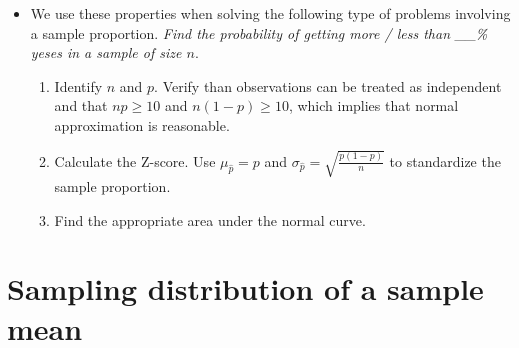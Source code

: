 \begin{itemize}
\item We use these properties when solving the following type of  problems involving a sample proportion.  
\emph{Find the probability of getting more / less than \_\_\% yeses in a sample of size $n$}.
\begin{enumerate}\vspace{-1mm}
\setlength{\itemsep}{0mm}
\item Identify $n$ and $p$. Verify than observations can be treated as independent and that $np\ge 10$ and $n(1-p)\ge 10$, which implies that normal approximation is reasonable. 
\item Calculate the Z-score.  Use $\mu_{\hat{p}} = p$ and $\sigma_{\hat{p}} = \sqrt{\frac{p(1-p)}{n}}$ to standardize the sample proportion.  
\item Find the appropriate area under the normal curve.  \end{enumerate}

\end{itemize}

{}






\section[Sampling distribution of a sample mean]{Sampling distribution of a sample mean }
\label{distributionofxbar}

